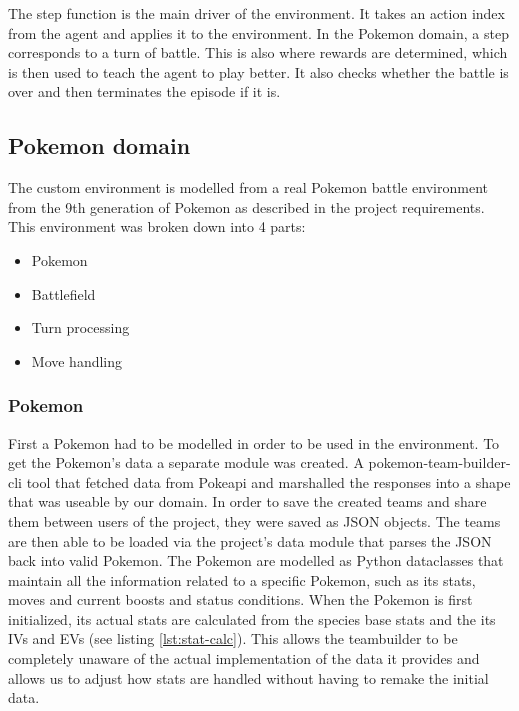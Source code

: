The step function is the main driver of the environment. It takes an action index from the agent and applies it to the environment. In the Pokemon domain, a step corresponds
to a turn of battle. This is also where rewards are determined, which is then used to teach the agent to play better. It also checks whether the battle is over and then
terminates the episode if it is. 

\subsection{Pokemon domain}
\label{subsec:pokemon-domain}
The custom environment is modelled from a real Pokemon battle environment from the 9th generation of Pokemon as described in the project requirements.
This environment was broken down into 4 parts:
\begin{itemize}
    \item Pokemon
    \item Battlefield
    \item Turn processing
    \item Move handling
\end{itemize}

\subsubsection{Pokemon}
First a Pokemon had to be modelled in order to be used in the environment.
To get the Pokemon's data a separate module was created. A pokemon-team-builder-cli \cite{TeambuilderCli} tool that
fetched data from Pokeapi \cite{PokeAPI} and marshalled the responses into a shape that was useable by our domain.
In order to save the created teams and share them between users of the project, they were saved as JSON objects.
The teams are then able to be loaded via the project's data module that parses the JSON back into valid Pokemon.
The Pokemon are modelled as Python dataclasses that maintain all the information related to a specific Pokemon, such as
its stats, moves and current boosts and status conditions. When the Pokemon is first initialized, its actual stats
are calculated from the species base stats and the its IVs and EVs (see listing \ref{lst:stat-calc}). This allows the teambuilder to be
completely unaware of the actual implementation of the data it provides and allows us to adjust how stats are handled
without having to remake the initial data.

